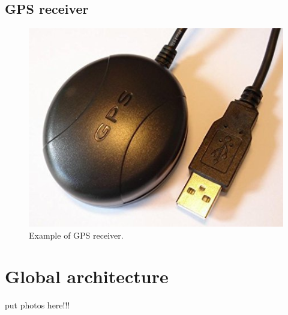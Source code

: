 \section{GPS receiver}

\begin{figure}[H]
\centering
    \includegraphics[scale=0.5,angle=0]{Images/GPS.jpg}
    \caption{Example of GPS receiver.}
    \label{fig:GPS}
\end{figure}

\chapter{Global architecture}

put photos here!!!

